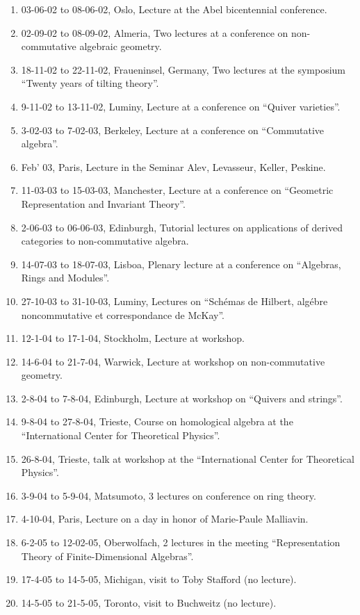 \documentclass{amsart}
\begin{document}
\begin{enumerate}
\item 03-06-02 to 08-06-02, Oslo, Lecture at the Abel bicentennial 
conference.
\item 02-09-02 to 08-09-02, Almeria, Two lectures at a conference
on non-commutative algebraic geometry.
\item 18-11-02 to 22-11-02, Fraueninsel, Germany, Two lectures
at the symposium ``Twenty years of tilting theory''.
\item 9-11-02 to 13-11-02, Luminy, Lecture at a conference on
``Quiver varieties''.
\item 3-02-03 to 7-02-03, Berkeley, Lecture at a conference on
``Commutative algebra''.
\item Feb' 03, Paris, Lecture in the Seminar Alev, Levasseur, Keller, Peskine.
\item 11-03-03 to 15-03-03, Manchester, Lecture at a conference on
  ``Geometric Representation and Invariant Theory''.
\item 2-06-03 to 06-06-03, Edinburgh, Tutorial lectures on applications
of derived categories to non-commutative algebra.
\item 14-07-03 to 18-07-03, Lisboa, Plenary lecture at a conference
  on ``Algebras, Rings and Modules''.
\item 27-10-03 to 31-10-03, Luminy, Lectures on ``Sch\'emas de Hilbert,
  alg\'ebre noncommutative et correspondance de McKay''.
\item 12-1-04 to 17-1-04, Stockholm, Lecture at workshop.
\item 14-6-04 to 21-7-04, Warwick, Lecture at workshop on non-commutative
geometry.
\item 2-8-04 to 7-8-04, Edinburgh, Lecture at workshop on ``Quivers and strings''.
\item 9-8-04 to 27-8-04, Trieste, Course on homological algebra at the
``International Center for Theoretical Physics''.
\item 26-8-04, Trieste, talk at workshop at the ``International Center for Theoretical Physics''.
\item 3-9-04 to 5-9-04, Matsumoto, 3 lectures on conference on ring theory.
\item 4-10-04, Paris, Lecture on a day in honor of Marie-Paule Malliavin.
\item 6-2-05 to 12-02-05, Oberwolfach, 2 lectures in the meeting ``Representation Theory of Finite-Dimensional Algebras''.
\item 17-4-05 to 14-5-05, Michigan, visit to Toby Stafford (no lecture).
\item 14-5-05 to 21-5-05, Toronto, visit to Buchweitz (no lecture).

\end{enumerate}
\end{document}
